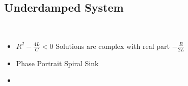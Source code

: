 \documentclass[preview]{standalone}
\begin{document}
\begin{center}
\subsection*{Underdamped System}\\
                    \begin{itemize}
                        \item $R^2 - \frac{4L}{C} < 0$ \rightarrow Solutions are complex with real part $-\frac{R}{2L}$
                        \item Phase Portrait \rightarrow Spiral Sink
                        \item 
                    \end{itemize}
\end{center}
\end{document}
